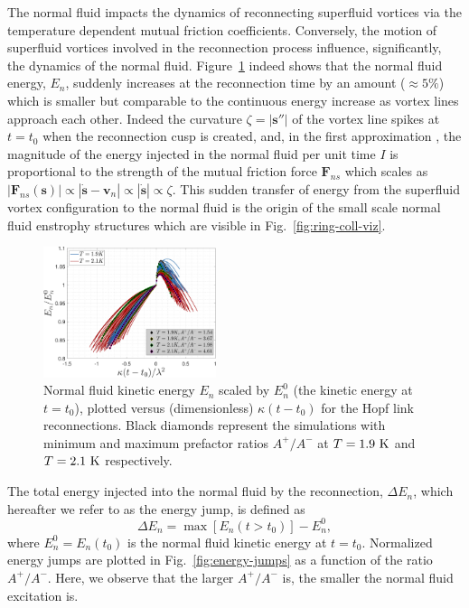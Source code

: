 \documentclass[9pt,twocolumn,twoside]{pnas-new}
\def\s{\mathbf{s}}
\def\v{\mathbf{v}}
\begin{document}
The normal fluid impacts the dynamics of reconnecting superfluid vortices via the temperature dependent mutual friction coefficients. Conversely, the motion of superfluid vortices involved in the reconnection process influence, significantly, the dynamics of the normal fluid. Figure~\ref{fig:energy-evol} indeed shows that the normal fluid energy, $E_n$,
suddenly increases at the reconnection time by an amount ($\approx 5\%$)
which is smaller but comparable to the continuous energy increase as vortex
lines approach each other. Indeed the
curvature $\zeta=|\s''|$ of the vortex line 
spikes at $t=t_0$ when
the reconnection cusp is created, and, in the first approximation \cite{galantucci-krstulovic-etal-2023},
the magnitude of the energy injected in the normal fluid per unit time $I$
is proportional to the strength of the mutual friction force $\mathbf{F}_{ns}$ which scales as
$|\mathbf{F}_{ns}(\s)|\propto|\dot{\s}-\v_n|\propto|\dot{\s}|\propto\zeta$. This sudden
transfer of energy
\cite{stasiakCrossComponentEnergyTransfer2024} from the superfluid
vortex configuration to the normal fluid is the origin of the 
small scale normal fluid enstrophy structures
which are visible in Fig.~\ref{fig:ring-coll-viz}.   

\begin{figure}
	\centering
	\includegraphics*[width=0.45\textwidth]{energy-evolution.pdf}
	\caption{Normal fluid kinetic energy $E_n$ scaled by $E_n^0$ (the 
kinetic energy at $t=t_0$), plotted versus (dimensionless)
$\kappa (t-t_0)$ for the Hopf link reconnections. Black diamonds represent the simulations 
with minimum and maximum prefactor ratios $A^+/A^-$ at $T=1.9~\rm K$ and 
$T=2.1~\rm K$ respectively.}
	\label{fig:energy-evol}
\end{figure}

The total energy injected into the normal fluid by the reconnection,
$\Delta E_n$, which hereafter
we refer to as the energy jump, is defined as
\begin{equation}
	\Delta E_n = \max{\left[E_n(t>t_0)\right]} - E_n^0,
\end{equation} 
%
where $E_n^0=E_n(t_0)$ is the normal fluid kinetic energy at $t=t_0$.
Normalized energy jumps are plotted in
Fig.~\ref{fig:energy-jumps} as a function of
the ratio $A^+/A^-$. Here, we observe that the larger $A^+/A^-$ is,
the smaller the normal fluid excitation is.
\end{document}
